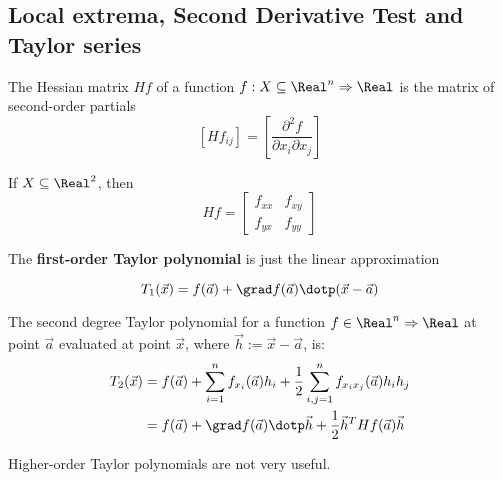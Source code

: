 \subsection{Local extrema, Second Derivative Test and Taylor series}


\begin{definition}
  The Hessian matrix $Hf$ of a function $f : X \subseteq \Real^n \Rightarrow \Real$ is the matrix of second-order partials
  \[
    \left[Hf_{ij}\right] = \left[\frac{\partial^2 f}{\partial x_i \partial x_j}\right]
  \]

  If $X \subseteq \Real^2$, then
  \[
    Hf = \begin{bmatrix}
      f_{xx} & f_{xy} \\
      f_{yx} & f_{yy}
    \end{bmatrix}
  \]
\end{definition}

The \textbf{first-order Taylor polynomial} is just the linear approximation

\[
  T_1(\vec{x}) = f(\vec{a}) + \grad f(\vec{a}) \dotp (\vec{x} - \vec{a})
\]

\begin{definition}
  The second degree Taylor polynomial for a function $f \in \Real^n \Rightarrow \Real$ at point $\vec{a}$ evaluated at point $\vec{x}$, where $\vec{h} := \vec{x} - \vec{a}$, is:
  \begin{align*}
    T_2(\vec{x}) &= f(\vec{a}) + \sum_{i = 1}^n f_{x_i}(\vec{a}) h_i + \frac{1}{2} \sum_{i,j=1}^n f_{x_i x_j}(\vec{a}) h_i h_j \\
    &= f(\vec{a}) + \grad f(\vec{a}) \dotp \vec{h} + \frac{1}{2} \vec{h}^T Hf(\vec{a}) \vec{h}
  \end{align*}
\end{definition}

Higher-order Taylor polynomials are not very useful.

